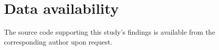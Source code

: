 \documentclass[preprint,12pt]{elsarticle}
\begin{document}
\section*{Data availability}
The source code supporting this study’s findings is available from the corresponding author upon request.









\end{document}
